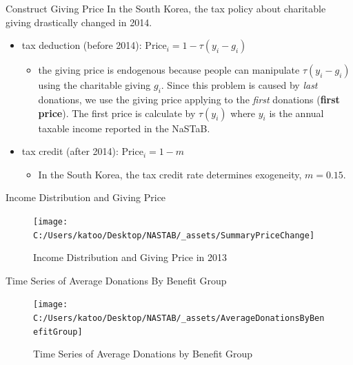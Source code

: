 \documentclass[
  ignorenonframetext,
]{beamer}
\providecommand{\tightlist}{%
  \setlength{\itemsep}{0pt}\setlength{\parskip}{0pt}}
\begin{document}
\begin{frame}{Construct Giving Price}
\protect\hypertarget{construct-giving-price}{}
In the South Korea, the tax policy about charitable giving drastically changed in 2014.

\begin{itemize}
\tightlist
\item
  tax deduction (before 2014): \(\text{Price}_i = 1 - \tau(y_i - g_i)\)

  \begin{itemize}
  \tightlist
  \item
    the giving price is endogenous because people can manipulate \(\tau(y_i - g_i)\) using the charitable giving \(g_i\). Since this problem is caused by \emph{last} donations, we use the giving price applying to the \emph{first} donations (\textbf{first price}). The first price is calculate by \(\tau(y_i)\) where \(y_i\) is the annual taxable income reported in the NaSTaB.
  \end{itemize}
\item
  tax credit (after 2014): \(\text{Price}_i = 1 - m\)

  \begin{itemize}
  \tightlist
  \item
    In the South Korea, the tax credit rate determines exogeneity, \(m = 0.15\).
  \end{itemize}
\end{itemize}
\end{frame}

\begin{frame}{Income Distribution and Giving Price}
\protect\hypertarget{income-distribution-and-giving-price}{}
\begin{figure}
\texttt{[image: C:/Users/katoo/Desktop/NASTAB/\_assets/SummaryPriceChange]} \caption{Income Distribution and Giving Price in 2013}\label{fig:unnamed-chunk-2}
\end{figure}
\end{frame}

\begin{frame}{Time Series of Average Donations By Benefit Group}
\protect\hypertarget{time-series-of-average-donations-by-benefit-group}{}
\begin{figure}
\texttt{[image: C:/Users/katoo/Desktop/NASTAB/\_assets/AverageDonationsByBenefitGroup]} \caption{Time Series of Average Donations by Benefit Group}\label{fig:unnamed-chunk-3}
\end{figure}
\end{frame}
\end{document}
